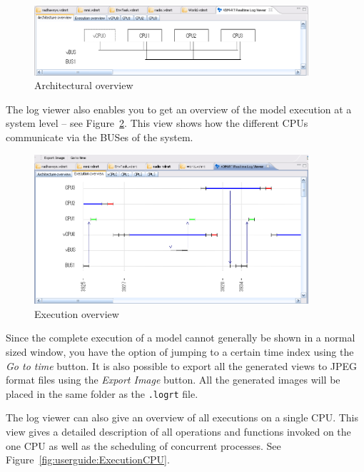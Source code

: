 \documentclass{overturerepchap}
\begin{document}
\begin{figure}[htp]
\begin{center}
  \includegraphics[width=4in]{figures/ArchitectureOverview}
  \caption{Architectural overview}
  \label{fig:userguide:ArchitecturalOverview}
\end{center}
\end{figure}

The log viewer also enables you to get an overview of
the model execution at a system level --
see Figure~\ref{fig:userguide:ExecutionOverview}.
This view shows how the different CPUs communicate via the
BUSes of the system. 

\begin{figure}[htp]
\begin{center}
  \includegraphics[width=4in]{figures/ExecutionOverview}
  \caption{Execution overview}
  \label{fig:userguide:ExecutionOverview}
\end{center}
\end{figure}

Since the complete execution of a model cannot generally be shown in a normal
sized window, you have the option of jumping to a certain time index
using the \emph{Go to time} button. It is
also possible to export all the generated views to JPEG format files
using the \emph{Export Image} button. All
the generated images will be placed in the same folder as the \texttt{.logrt}
file.

The log viewer can
also give an overview of all executions on a single CPU. This view
gives a detailed description of all operations and functions invoked
on the one CPU as well as the scheduling of concurrent processes. See
Figure~\ref{fig:userguide:ExecutionCPU}. 
\end{document}
